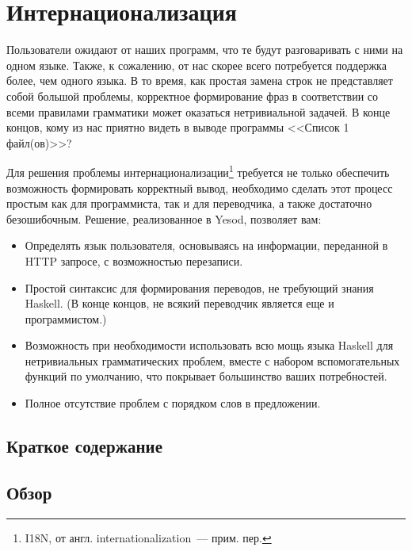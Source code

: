 \chapter{Интернационализация}\label{chap:i18n} %

Пользователи ожидают от наших программ, что те будут разговаривать с ними на одном языке. Также, к сожалению, от нас скорее всего потребуется поддержка более, чем одного языка. В то время, как простая замена строк не представляет собой большой проблемы, корректное формирование фраз в соответствии со всеми правилами грамматики может оказаться нетривиальной задачей. В конце концов, кому из нас приятно видеть в выводе программы <<Список 1 файл(ов)>>?

Для решения проблемы интернационализации\footnote{I18N, от англ. internationalization~--- прим. пер.} требуется не только обеспечить возможность формировать корректный вывод, необходимо сделать этот процесс простым как для программиста, так и для переводчика, а также достаточно безошибочным. Решение, реализованное в Yesod, позволяет вам:

\begin{itemize}
  \item Определять язык пользователя, основываясь на информации, переданной в HTTP запросе, с возможностью перезаписи.
  \item Простой синтаксис для формирования переводов, не требующий знания Haskell. (В конце концов, не всякий переводчик является еще и программистом.)
  \item Возможность при необходимости использовать всю мощь языка Haskell для нетривиальных грамматических проблем, вместе с набором вспомогательных функций по умолчанию, что покрывает большинство ваших потребностей.
  \item Полное отсутствие проблем с порядком слов в предложении. %
\end{itemize}

\section{Краткое содержание} %



\section{Обзор} %

